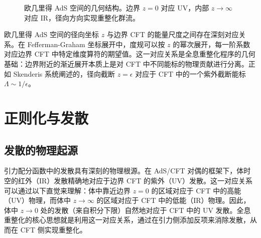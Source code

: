 \begin{figure}[htbp]
\centering
{}
\caption{欧几里得 AdS 空间的几何结构。边界 $z=0$ 对应 UV，内部 $z \to \infty$ 对应 IR，径向方向实现重整化群流。}
\label{fig:ads_boundary}
\end{figure}

\begin{remark}[径向坐标与能量尺度的对应]
欧几里得 AdS 空间的径向坐标 $z$ 与边界 CFT 的能量尺度之间存在深刻对应关系。在 Fefferman-Graham 坐标展开\cite{deHaro2000}中，度规可以按 $z$ 的幂次展开，每一阶系数对应边界 CFT 中特定维度算符的期望值。这一对应关系是全息重整化程序的几何基础：边界附近的渐近展开本质上是对 CFT 中不同能标的物理贡献进行分离。正如 Skenderis\cite{Skenderis2002} 系统阐述的，径向截断 $z = \epsilon$ 对应于 CFT 中的一个紫外截断能标 $\Lambda \sim 1/\epsilon$。
\end{remark}

\section{正则化与发散}

\subsection{发散的物理起源}

\begin{note}[发散的物理本质]
引力配分函数中的发散具有深刻的物理根源。在 AdS/CFT 对偶的框架下，体时空的红外（IR）发散精确地对应于边界 CFT 的紫外（UV）发散。这一对应关系可以通过以下直觉来理解：体中靠近边界 $z=0$ 的区域对应于 CFT 中的高能（UV）物理，而体中 $z \to \infty$ 的区域对应于 CFT 中的低能（IR）物理。因此，体中 $z \to 0$ 处的发散（来自积分下限）自然地对应于 CFT 中的 UV 发散。全息重整化\cite{Skenderis2002}的核心思想就是利用这一对应关系，通过在引力侧添加反项来消除发散，从而在 CFT 侧实现重整化。
\end{note}

